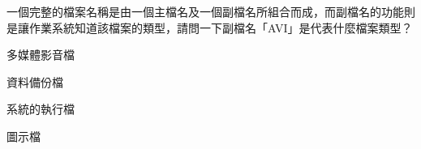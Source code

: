 \ifx\ntpcNinetyTwo\undefined[92學年基北區] \fi
一個完整的檔案名稱是由一個主檔名及一個副檔名所組合而成，而副檔名的功能則是讓作業系統知道該檔案的類型，請問一下副檔名「AVI」是代表什麼檔案類型？
  \begin{optionlist}
  \item 多媒體影音檔\label{ntpc-92-a31}
  \item 資料備份檔
  \item 系統的執行檔
  \item 圖示檔
  \end{optionlist}